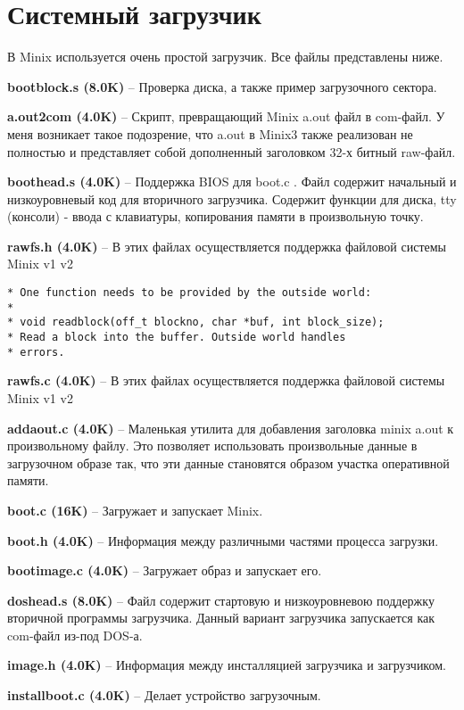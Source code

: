 \newpage
\section{Системный загрузчик}

В Minix используется очень простой загрузчик. Все файлы представлены ниже.

\textbf{bootblock.s (8.0K)} -- Проверка диска, а также пример загрузочного сектора.

\textbf{a.out2com (4.0K)} -- Скрипт, превращающий Minix a.out файл в com-файл.
У меня возникает такое подозрение, что a.out в Minix3 также реализован не полностью и представляет собой дополненный заголовком 32-х битный raw-файл.

\textbf{boothead.s (4.0K)} -- Поддержка BIOS для boot.c .
Файл содержит начальный и низкоуровневый код для вторичного загрузчика. Содержит функции для диска, tty (консоли) - ввода с клавиатуры, копирования памяти в произвольную точку.

\textbf{rawfs.h (4.0K)} -- В этих файлах осуществляется поддержка файловой системы Minix v1 v2
\begin{Verbatim}[frame=single]
* One function needs to be provided by the outside world:
*
* void readblock(off_t blockno, char *buf, int block_size);
* Read a block into the buffer. Outside world handles
* errors.
\end{Verbatim}

\textbf{rawfs.c (4.0K)} -- В этих файлах осуществляется поддержка файловой системы Minix v1 v2

\textbf{addaout.c (4.0K)} -- Маленькая утилита для добавления заголовка minix a.out к произвольному файлу. Это позволяет использовать произвольные данные в загрузочном образе так, что эти данные становятся образом участка оперативной памяти.

\textbf{boot.c (16K)} -- Загружает и запускает Minix.

\textbf{boot.h (4.0K)} -- Информация между различными частями процесса загрузки.

\textbf{bootimage.c (4.0K)} -- Загружает образ и запускает его.

\textbf{doshead.s (8.0K)} -- Файл содержит стартовую и низкоуровневою поддержку вторичной программы загрузчика. Данный вариант загрузчика запускается как com-файл из-под DOS-а.

\textbf{image.h (4.0K)} -- Информация между инсталляцией загрузчика и загрузчиком.

\textbf{installboot.c (4.0K)} -- Делает устройство загрузочным.

